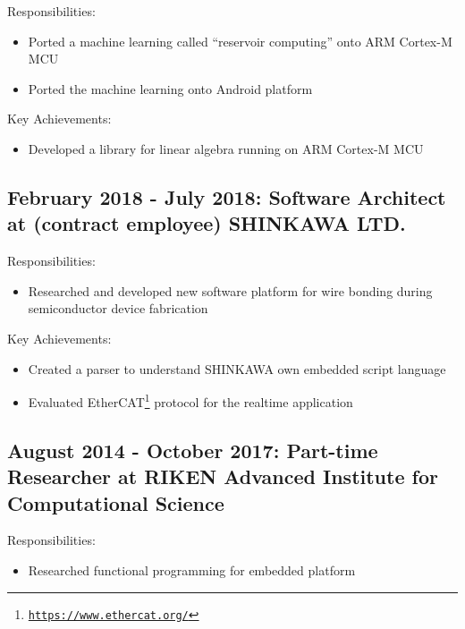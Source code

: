 \documentclass[letterpaper]{article}
\begin{document}
\noindent Responsibilities:

\begin{itemize}
  \item Ported a machine learning called ``reservoir computing'' onto ARM Cortex-M MCU
  \item Ported the machine learning onto Android platform
\end{itemize}

\noindent Key Achievements:

\begin{itemize}
  \item Developed a library for linear algebra running on ARM Cortex-M MCU
\end{itemize}

\subsection*{February 2018 - July 2018: Software Architect at (contract employee) SHINKAWA LTD.}

\noindent Responsibilities:

\begin{itemize}
  \item Researched and developed new software platform for wire bonding during semiconductor device fabrication
\end{itemize}

\noindent Key Achievements:

\begin{itemize}
  \item Created a parser to understand SHINKAWA own embedded script language
  \item Evaluated EtherCAT\footnote{\href{https://www.ethercat.org/}{\tt https://www.ethercat.org/}} protocol for the realtime application
\end{itemize}

\subsection*{August 2014 - October 2017: Part-time Researcher at RIKEN Advanced Institute for Computational Science}

\noindent Responsibilities:

\begin{itemize}
  \item Researched functional programming for embedded platform
\end{itemize}
\end{document}
